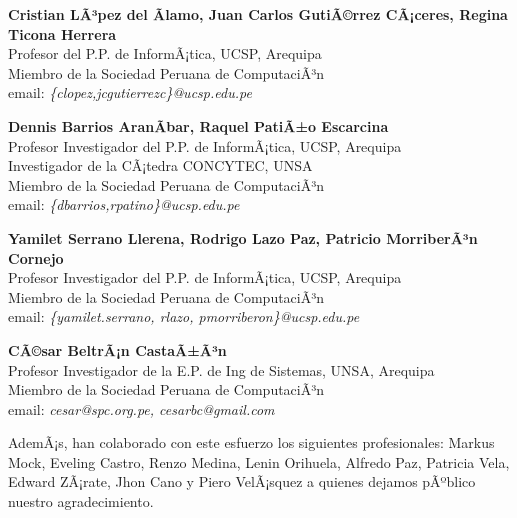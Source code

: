 \begin{center}
\textbf{Cristian LÃ³pez del Ãlamo, Juan Carlos GutiÃ©rrez CÃ¡ceres, Regina Ticona Herrera}\\
Profesor del P.P. de InformÃ¡tica, UCSP, Arequipa\\
Miembro de la Sociedad Peruana de ComputaciÃ³n\\
email: \textit{\{clopez,jcgutierrezc\}@ucsp.edu.pe}
\end{center}

\begin{center}
\textbf{Dennis Barrios AranÃ­bar, Raquel PatiÃ±o Escarcina}\\
Profesor Investigador del P.P. de InformÃ¡tica, UCSP, Arequipa\\
Investigador de la CÃ¡tedra CONCYTEC, UNSA\\
Miembro de la Sociedad Peruana de ComputaciÃ³n\\
email: \textit{\{dbarrios,rpatino\}@ucsp.edu.pe}
\end{center}

\begin{center}
\textbf{Yamilet Serrano Llerena, Rodrigo Lazo Paz, Patricio MorriberÃ³n Cornejo}\\
Profesor Investigador del P.P. de InformÃ¡tica, UCSP, Arequipa\\
Miembro de la Sociedad Peruana de ComputaciÃ³n\\
email: \textit{\{yamilet.serrano, rlazo, pmorriberon\}@ucsp.edu.pe}
\end{center}

\begin{center}
\textbf{CÃ©sar BeltrÃ¡n CastaÃ±Ã³n}\\
Profesor Investigador de la E.P. de Ing de Sistemas, UNSA, Arequipa\\
Miembro de la Sociedad Peruana de ComputaciÃ³n\\
email: \textit{cesar@spc.org.pe, cesarbc@gmail.com}
\end{center}

AdemÃ¡s, han colaborado con este esfuerzo los siguientes profesionales: Markus Mock, Eveling Castro, Renzo Medina, Lenin Orihuela, Alfredo Paz, Patricia Vela, Edward ZÃ¡rate, Jhon Cano y Piero VelÃ¡squez a quienes dejamos pÃºblico nuestro agradecimiento.
